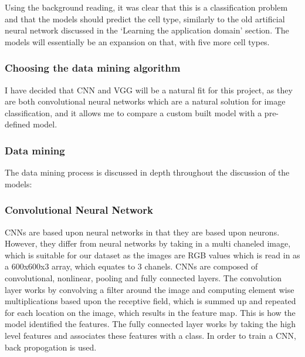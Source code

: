 \documentclass[11pt]{article}
\begin{document}
Using the background reading, it was clear that this is a classification
problem and that the models should predict the cell type, similarly to
the old artificial neural network discussed in the `Learning the
application domain' section. The models will essentially be an expansion
on that, with five more cell types.

\hypertarget{choosing-the-data-mining-algorithm}{%
\subsubsection{Choosing the data mining
algorithm}\label{choosing-the-data-mining-algorithm}}

I have decided that CNN and VGG will be a natural fit for this project,
as they are both convolutional neural networks which are a natural
solution for image classification, and it allows me to compare a custom
built model with a pre-defined model.

\hypertarget{data-mining}{%
\subsubsection{Data mining}\label{data-mining}}

The data mining process is discussed in depth throughout the discussion
of the models:

    \hypertarget{convolutional-neural-network}{%
\subsubsection{Convolutional Neural
Network}\label{convolutional-neural-network}}

CNNs are based upon neural networks in that they are based upon neurons.
However, they differ from neural networks by taking in a multi chaneled
image, which is suitable for our dataset as the images are RGB values
which is read in as a 600x600x3 array, which equates to 3 chanels. CNNs
are composed of convolutional, nonlinear, pooling and fully connected
layers. The convolution layer works by convolving a filter around the
image and computing element wise multiplications based upon the
receptive field, which is summed up and repeated for each location on
the image, which results in the feature map. This is how the model
identified the features. The fully connected layer works by taking the
high level features and associates these features with a class. In order
to train a CNN, back propogation is used.
\end{document}
